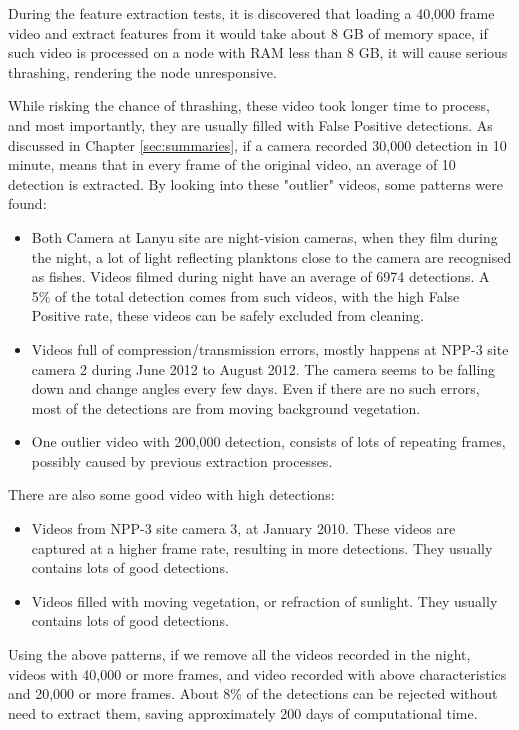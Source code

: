\documentclass[bsc,logo,twoside,fullspacing,parskip]{infthesis}
\begin{document}
During the feature extraction tests, it is discovered that loading a 40,000 frame video and extract features from it would take about 8 GB of memory space, if such video is processed on a node with RAM less than 8 GB, it will cause serious thrashing, rendering the node unresponsive.  

While risking the chance of thrashing, these video took longer time to process, and most importantly, they are usually filled with False Positive detections. As discussed in Chapter \ref{sec:summaries}, if a camera recorded 30,000 detection in 10 minute, means that in every frame of the original video, an average of 10 detection is extracted. By looking into these "outlier" videos, some patterns were found:

\begin{itemize}
\item
Both Camera at Lanyu site are night-vision cameras, when they film during the night, a lot of light reflecting planktons close to the camera are recognised as fishes. Videos filmed during night have an average of 6974 detections. A 5\% of the total detection comes from such videos, with the high False Positive rate, these videos can be safely excluded from cleaning.
\item
Videos full of compression/transmission errors, mostly happens at NPP-3 site camera 2 during June 2012 to August 2012. The camera seems to be falling down and change angles every few days. Even if there are no such errors, most of the detections are from moving background vegetation.
\item
One outlier video with 200,000 detection, consists of lots of repeating frames, possibly caused by previous extraction processes.
\end{itemize}
There are also some good video with high detections: 
\begin{itemize}
\item
Videos from NPP-3 site camera 3, at January 2010. These videos are captured at a higher frame rate, resulting in more detections. They usually contains lots of good detections.
\item
Videos filled with moving vegetation, or refraction of sunlight. They usually contains lots of good detections.
\end{itemize}

Using the above patterns, if we remove all the videos recorded in the night, videos with 40,000 or more frames, and video recorded with above characteristics and 20,000 or more frames. About 8\% of the detections can be rejected without need to extract them, saving approximately 200 days of computational time.
\end{document}
